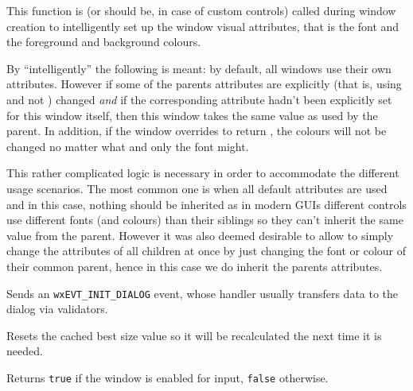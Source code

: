\label{wxwindowinheritattributes}


This function is (or should be, in case of custom controls) called during
window creation to intelligently set up the window visual attributes, that is
the font and the foreground and background colours.

By ``intelligently'' the following is meant: by default, all windows use their
own  attributes. However
if some of the parents attributes are explicitly (that is, using
 and not
) changed \emph{and} if the
corresponding attribute hadn't been explicitly set for this window itself,
then this window takes the same value as used by the parent. In addition, if
the window overrides 
to return \false, the colours will not be changed no matter what and only the
font might.

This rather complicated logic is necessary in order to accommodate the
different usage scenarios. The most common one is when all default attributes
are used and in this case, nothing should be inherited as in modern GUIs
different controls use different fonts (and colours) than their siblings so
they can't inherit the same value from the parent. However it was also deemed
desirable to allow to simply change the attributes of all children at once by
just changing the font or colour of their common parent, hence in this case we
do inherit the parents attributes.


\label{wxwindowinitdialog}


Sends an {\tt wxEVT\_INIT\_DIALOG} event, whose handler usually transfers data
to the dialog via validators.


\label{wxwindowinvalidatebestsize}


Resets the cached best size value so it will be recalculated the next time it is needed.


\label{wxwindowisenabled}


Returns {\tt true} if the window is enabled for input, {\tt false} otherwise.

